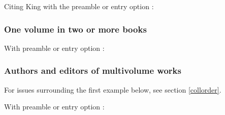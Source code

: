\documentclass[11pt,letterpaper,oneside]{article}
\begin{document}
\begin{citebib}
\item \cite[180]{chen2010.3}
\item \cite[169--71]{king2014}
\end{citebib}

\noindent Citing King with the preamble or entry option
:

\begin{citebib}
\item \cite[169--71]{king2014}
\end{citebib}

\subsubsection{One volume in two or more books}
\label{14.121}

\begin{citebib}
\item \cite[351]{lach1977}
\item \cite{harley1994}
\end{citebib}

\noindent With preamble or entry option :

\begin{citebib}
\item \cite[351]{lach1977}
\item \cite{harley1994}
\end{citebib}

\subsubsection{Authors and editors of multivolume works}
\label{14.122}

For issues surrounding the first example below, see section
\ref{collorder}.

\begin{citebib}
\item \cite{barrows1959}
\item \cite{donne1995}
\end{citebib}

\noindent With preamble or entry option :
\end{document}

